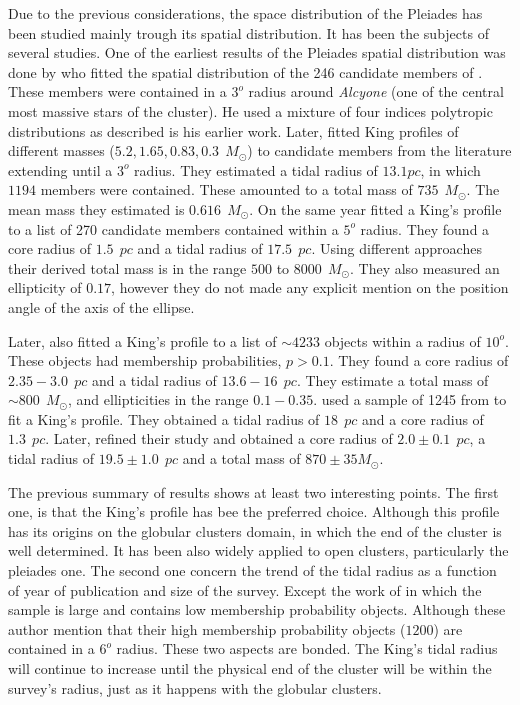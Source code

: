 Due to the previous considerations, the space distribution of the Pleiades has been studied mainly trough its spatial distribution.
It has been the subjects of several studies. One of the earliest results of the Pleiades spatial distribution was done by \citet{Limber1962} who fitted the spatial distribution of the 246 candidate members of \citet{Trumpler1921}. These members were contained in a $3^o$ radius around \emph{Alcyone} (one of the central most massive stars of the cluster). He used a mixture of four indices polytropic distributions as described is his earlier \citet{Limber1961} work. Later, \citet{Pinfield1998} fitted King profiles \citep{King1962} of different masses ($5.2,1.65,0.83,0.3 \ \ M_{\odot}$) to candidate members from the literature extending until a $3^o$ radius. They estimated a tidal radius of $13.1pc$, in which $1194$ members were contained. These amounted to a total mass of $735\ \ M_{\odot}$. The mean mass they estimated is $0.616\ \ M_{\odot}$. On the same year \citet{Raboud1998} fitted a King's profile to a list of 270 candidate members contained within a $5^o$ radius. They found a core radius of $1.5\ \ pc$ and a tidal radius of $17.5\ \ pc$. Using different approaches their derived total mass is in the range $500$ to $8000 \ \ M_{\odot}$. They also measured an ellipticity of $0.17$, however they do not made any explicit mention on the position angle of the axis of the ellipse.

Later, \citet{Adams2001} also fitted a King's profile to a list of $\sim 4233$ objects within a radius of $10^o$. These objects had membership probabilities, $p>0.1$. They found a core radius of $2.35-3.0\ \ pc$ and a tidal radius of $13.6-16\ \ pc$. They estimate a total mass of $\sim 800 \ \ M_{\odot}$, and ellipticities in the range $0.1-0.35$. \citet{Converse2008} used a sample of 1245 from \citet{Stauffer2007} to fit a King's profile. They obtained a tidal radius of $18\ \ pc$ and a core radius of  $1.3 \ \ pc$. Later, \citet{Converse2010} refined their study and obtained a core radius of $2.0\pm0.1 \ \ pc$, a tidal radius of $19.5 \pm 1.0 \ \ pc $ and a total mass of $870\pm35 M_{\odot}$.

The previous summary of results shows at least two interesting points. The first one, is that the King's profile \citep{King1962} has bee the preferred choice. Although this profile has its origins on the globular clusters domain, in which the end of the cluster is well determined. It has been also widely applied to open clusters, particularly the pleiades one. The second one concern the trend of the tidal radius as a function of year of publication and size of the survey. Except the work of \citet{Adams2001} in which the sample is large and contains low membership probability objects. Although these author mention that their high membership probability objects ($1200$) are contained in a $6^o$ radius. These two aspects are bonded. The King's tidal radius will continue to increase until the physical end of the cluster will be within the survey's radius, just as it happens with the globular clusters. 
  
